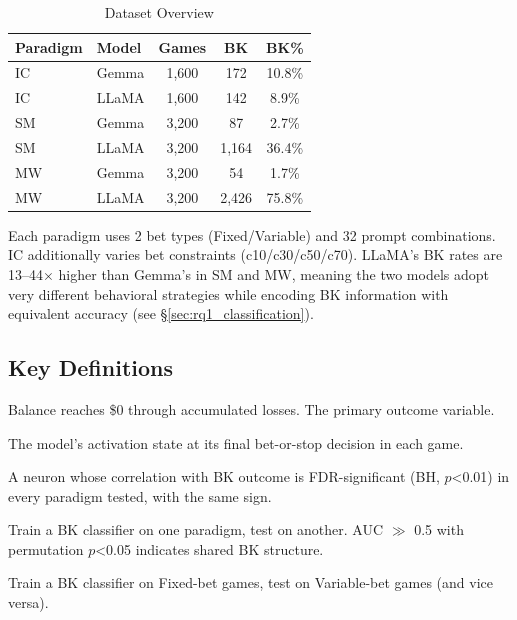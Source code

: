 \documentclass[11pt,a4paper]{article}
\begin{document}
\begin{table}[H]
\centering
\caption{Dataset Overview}
\begin{tabular}{llccc}
\toprule
\textbf{Paradigm} & \textbf{Model} & \textbf{Games} & \textbf{BK} & \textbf{BK\%} \\
\midrule
IC & Gemma & 1{,}600 & 172 & 10.8\% \\
IC & LLaMA & 1{,}600 & 142 & 8.9\% \\
SM & Gemma & 3{,}200 & 87 & 2.7\% \\
SM & LLaMA & 3{,}200 & 1{,}164 & 36.4\% \\
MW & Gemma & 3{,}200 & 54 & 1.7\% \\
MW & LLaMA & 3{,}200 & 2{,}426 & 75.8\% \\
\bottomrule
\end{tabular}
\end{table}

Each paradigm uses 2 bet types (Fixed/Variable) and 32 prompt combinations. IC additionally varies bet constraints (c10/c30/c50/c70). LLaMA's BK rates are 13--44$\times$ higher than Gemma's in SM and MW, meaning the two models adopt very different behavioral strategies while encoding BK information with equivalent accuracy (see \S\ref{sec:rq1_classification}).

\subsection{Key Definitions}

\begin{description}[style=nextline, leftmargin=2em]
    \item[Bankruptcy (BK)] Balance reaches \$0 through accumulated losses. The primary outcome variable.
    \item[Decision Point (DP)] The model's activation state at its final bet-or-stop decision in each game.
    \item[Universal BK neuron] A neuron whose correlation with BK outcome is FDR-significant (BH, $p$<0.01) in every paradigm tested, with the same sign.
    \item[Cross-domain transfer] Train a BK classifier on one paradigm, test on another. AUC $\gg$ 0.5 with permutation $p$<0.05 indicates shared BK structure.
    \item[Cross-bet-type transfer (F1)] Train a BK classifier on Fixed-bet games, test on Variable-bet games (and vice versa).
\end{description}
\end{document}
